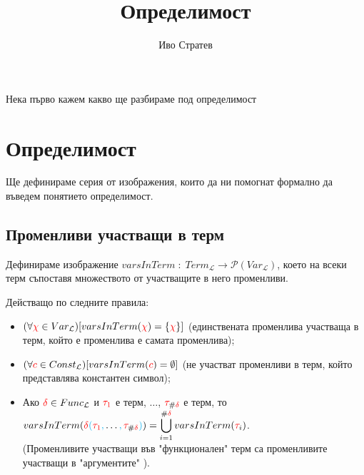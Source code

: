 \documentclass{article}[12pt]
\title{Определимост}
\author{Иво Стратев}
\newcommand{\Lang}{\mathcal{L}}
\begin{document}
\maketitle

\tableofcontents

\pagebreak

Нека първо кажем какво ще разбираме под определимост

\section{Определимост}

Ще дефинираме серия от изображения, които да ни помогнат формално да въведем понятието определимост.

\subsection{Променливи участващи в терм}

Дефинираме изображение \(varsInTerm \; : \; Term_\Lang \to \mathcal{P}(Var_\Lang)\),
което на всеки терм съпоставя множеството от участващите в него променливи.

Действащо по следните правила:

\begin{itemize}
\item \((\forall \color{red} \chi \color{black} \in Var_\Lang)[varsInTerm(\color{red} \chi \color{black}) = \{\color{red} \chi \color{black}\}]\) (единствената променлива участваща в терм, който е променлива е самата променлива);
\item \((\forall \color{red} c \color{black} \in Const_\Lang)[varsInTerm(\color{red} c \color{black}) = \emptyset]\) (не участват променливи в терм, който представлява константен символ);
\item Ако \(\color{red} \delta \color{black} \in Func_\Lang\) и \(\color{red}\tau_1\) е терм, \(\dots\), \(\color{red}\tau_{\color{black}\#\color{red}\delta}\) е терм, то \\
\(varsInTerm(\color{red} \delta \color{cyan} (\color{red}\tau_1 \color{cyan} , \color{black} \dots \color{cyan} , \color{red} \tau_{\color{black}\#\color{red}\delta} \color{cyan} ) \color{black}) = \displaystyle\bigcup_{i = 1}^{\color{black}\#\color{red}\delta \color{black}} varsInTerm(\color{red} \tau_{\color{black} i } \color{black} )\). \\
(Променливите участващи във "функционален" \; терм са променливите участващи в "аргументите" ).
\end{itemize}
\end{document}
